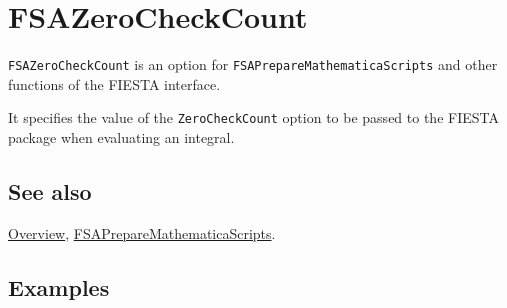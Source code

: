 \documentclass[../FeynHelpersManual.tex]{subfiles}
\begin{document}
\hypertarget{fsazerocheckcount}{
\section{FSAZeroCheckCount}\label{fsazerocheckcount}}

\texttt{FSAZeroCheckCount} is an option for
\texttt{FSAPrepareMathematicaScripts} and other functions of the FIESTA
interface.

It specifies the value of the \texttt{ZeroCheckCount} option to be
passed to the FIESTA package when evaluating an integral.

\subsection{See also}

\hyperlink{toc}{Overview},
\hyperlink{fsapreparemathematicascripts}{FSAPrepareMathematicaScripts}.

\subsection{Examples}
\end{document}
